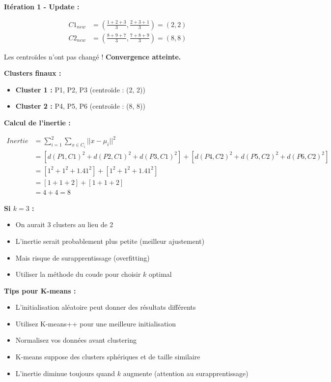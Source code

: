 \documentclass[11pt,a4paper]{article}
\begin{document}
\begin{solutionbox}
\textbf{Itération 1 - Update :}

\begin{align*}
C1_{new} &= \left(\frac{1+2+3}{3}, \frac{2+3+1}{3}\right) = (2, 2) \\
C2_{new} &= \left(\frac{8+9+7}{3}, \frac{7+8+9}{3}\right) = (8, 8)
\end{align*}

Les centroïdes n'ont pas changé ! \textbf{Convergence atteinte.}

\textbf{Clusters finaux :}
\begin{itemize}
    \item \textbf{Cluster 1 :} P1, P2, P3 (centroïde : (2, 2))
    \item \textbf{Cluster 2 :} P4, P5, P6 (centroïde : (8, 8))
\end{itemize}

\textbf{Calcul de l'inertie :}

\begin{align*}
Inertie &= \sum_{i=1}^{2}\sum_{x \in C_i}||x - \mu_i||^2 \\
        &= [d(P1,C1)^2 + d(P2,C1)^2 + d(P3,C1)^2] + [d(P4,C2)^2 + d(P5,C2)^2 + d(P6,C2)^2] \\
        &= [1^2 + 1^2 + 1.41^2] + [1^2 + 1^2 + 1.41^2] \\
        &= [1 + 1 + 2] + [1 + 1 + 2] \\
        &= 4 + 4 = 8
\end{align*}

\textbf{Si $k=3$ :}
\begin{itemize}
    \item On aurait 3 clusters au lieu de 2
    \item L'inertie serait probablement plus petite (meilleur ajustement)
    \item Mais risque de surapprentissage (overfitting)
    \item Utiliser la méthode du coude pour choisir $k$ optimal
\end{itemize}
\end{solutionbox}

\begin{tipbox}
\textbf{Tips pour K-means :}
\begin{itemize}
    \item L'initialisation aléatoire peut donner des résultats différents
    \item Utilisez K-means++ pour une meilleure initialisation
    \item Normalisez vos données avant clustering
    \item K-means suppose des clusters sphériques et de taille similaire
    \item L'inertie diminue toujours quand $k$ augmente (attention au surapprentissage)
\end{itemize}
\end{tipbox}
\end{document}
